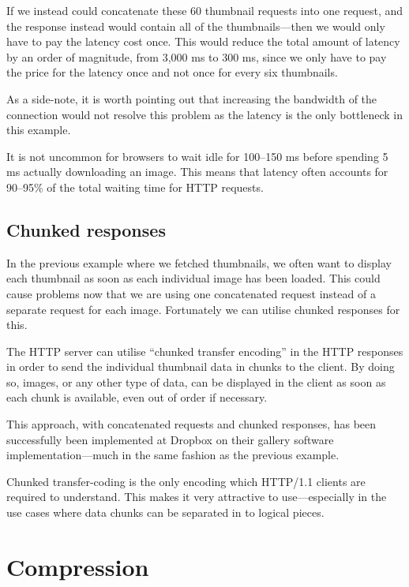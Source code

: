 \documentclass{cslthse-msc}
\begin{document}
If we instead could concatenate these 60 thumbnail requests into one request, and the response instead would contain all of the thumbnails---then we would only have to pay the latency cost once. This would reduce the total amount of latency by an order of magnitude, from 3,000 ms to 300 ms, since we only have to pay the price for the latency once and not once for every six thumbnails.

As a side-note, it is worth pointing out that increasing the bandwidth of the connection would not resolve this problem as the latency is the only bottleneck in this example.

It is not uncommon for browsers to wait idle for 100--150 ms before spending 5 ms actually downloading an image. This means that latency often accounts for 90--95\% of the total waiting time for HTTP requests\cite{latency}.

\subsection{Chunked responses}
In the previous example where we fetched thumbnails, we often want to display each thumbnail as soon as each individual image has been loaded. This could cause problems now that we are using one concatenated request instead of a separate request for each image. Fortunately we can utilise chunked responses for this.

The HTTP server can utilise \enquote{chunked transfer encoding} in the HTTP responses in order to send the individual thumbnail data in chunks\cite{chunked} to the client. By doing so, images, or any other type of data, can be displayed in the client as soon as each chunk is available, even out of order if necessary. 

This approach, with concatenated requests and chunked responses, has been successfully been implemented at Dropbox on their gallery software implementation\cite{dropbox_chunked}---much in the same fashion as the previous example.

Chunked transfer-coding is the only encoding which HTTP/1.1 clients are required to understand\cite{chunked_required}. This makes it very attractive to use---especially in the use cases where data chunks can be separated in to logical pieces.

\section{Compression}
\label{compression}
\end{document}
